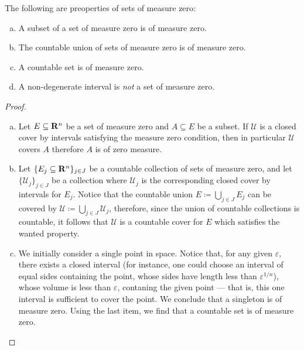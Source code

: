 \begin{lemma}
\label{lem:measure-zero-properties}
The following are preoperties of sets of measure zero:
\begin{enumerate}[(a)]\setlength\itemsep{0em}
\item A subset of a set of measure zero is of measure zero.
\item The countable union of sets of measure zero is of measure zero.
\item A countable set is of measure zero.
\item A non-degenerate interval is \emph{not} a set of measure zero.
\end{enumerate}
\end{lemma}

\begin{proof}
\begin{enumerate}[(a)]\setlength\itemsep{0em}
\item Let \(E \subseteq \mathbf{R}^n\) be a set of measure zero and \(A \subseteq E\) be
  a subset. If \(\mathcal U\) is a closed cover by intervals satisfying the
  measure zero condition, then in particular \(\mathcal U\) covers \(A\)
  therefore \(A\) is of zero measure.

\item Let \(\{E_{j} \subseteq \mathbf{R}^{n}\}_{j \in J}\) be a countable collection of
  sets of measure zero, and let \(\{\mathcal U_{j}\}_{j \in J}\) be a collection
  where \(\mathcal U_j\) is the corresponding closed cover by intervals for
  \(E_j\). Notice that the countable union \(E \coloneq \bigcup_{j \in J} E_j\)
  can be covered by \(\mathcal U \coloneq \bigcup_{j \in J} \mathcal U_j\),
  therefore, since the union of countable collections is countable, it follows
  that \(\mathcal U\) is a countable cover for \(E\) which satisfies the wanted
  property.

\item We initially consider a single point in space. Notice that, for any given
  \(\varepsilon\), there exists a closed interval (for instance, one could
  choose an interval of equal sides containing the point, whose sides have
  length less than \(\varepsilon^{1/n}\)), whose volume is less than
  \(\varepsilon\), contaning the given point --- that is, this one interval is
  sufficient to cover the point. We conclude that a singleton is of measure
  zero. Using the last item, we find that a countable set is of measure zero.


\end{enumerate}
\end{proof}
